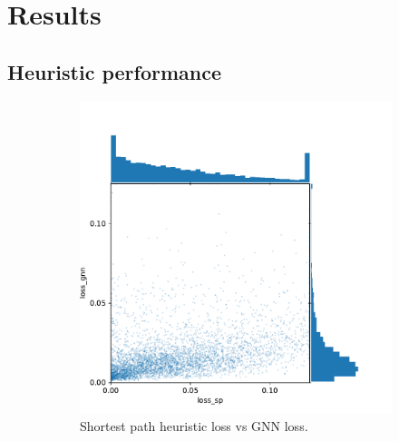 \documentclass[english, 12pt, a4paper, sci, utf8, a-2b, online]{aaltothesis}
\begin{document}
\section{Results}
\label{sec:results}
\subsection{Heuristic performance}
\label{sec:heur-perf}

\begin{figure}[b]
    \begin{subfigure}{0.5\textwidth}
        \centering
        \includegraphics[width=\linewidth]{figures/loss-loss.pdf}
        \caption{Shortest path heuristic loss vs GNN loss.}
        \label{fig:results-ll}
    \end{subfigure}
    \begin{subfigure}{0.5\textwidth}
        \centering

\end{subfigure}
\end{figure}
\end{document}
